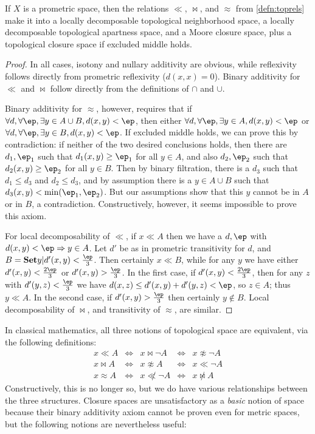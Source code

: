 \documentclass{article}
\def\napprox{\not\approx}
\def\cpl#1{\neg #1}
\let\implies\Rightarrow
\def\fep#1#2{\frac{\if1#1\else#1\fi\ep}{#2}}
\begin{document}
\begin{thm}\label{thm:pmet-top}
  If $X$ is a prometric space, then the relations $\ll$, $\bowtie$, and $\approx$ from \cref{defn:toprels} make it into a locally decomposable topological neighborhood space, a locally decomposable topological apartness space, and a Moore closure space, plus a topological closure space if excluded middle holds.
\end{thm}
\begin{proof}
  In all cases, isotony and nullary additivity are obvious, while reflexivity follows directly from prometric reflexivity ($d(x,x)=0$).
  Binary additivity for $\ll$ and $\bowtie$ follow directly from the definitions of $\cap$ and $\cup$.

  Binary additivity for $\approx$, however, requires that if $\forall d,\forall \ep, \exists y\in A\cup B, d(x,y)<\ep$, then either $\forall d,\forall \ep, \exists y\in A, d(x,y)<\ep$ or $\forall d,\forall \ep, \exists y\in B, d(x,y)<\ep$.
  If excluded middle holds, we can prove this by contradiction: if neither of the two desired conclusions holds, then there are $d_1,\ep_1$ such that $d_1(x,y)\ge \ep_1$ for all $y\in A$, and also $d_2,\ep_2$ such that $d_2(x,y)\ge\ep_2$ for all $y\in B$.
  Then by binary filtration, there is a $d_3$ such that $d_1\le d_3$ and $d_2\le d_3$, and by assumption there is a $y\in A\cup B$ such that $d_3(x,y)<\min(\ep_1,\ep_2)$.
  But our assumptions show that this $y$ cannot be in $A$ or in $B$, a contradiction.
  Constructively, however, it seems impossible to prove this axiom.

  For local decomposability of $\ll$, if $x\ll A$ then we have a $d,\ep$ with $d(x,y)<\ep \implies y\in A$.
  Let $d'$ be as in prometric transitivity for $d$, and $B = \setof{ y | d'(x,y) < \fep13}$.
  Then certainly $x\ll B$, while for any $y$ we have either $d'(x,y)<\fep23$ or $d'(x,y)>\fep13$.
  In the first case, if $d'(x,y)<\fep23$, then for any $z$ with $d'(y,z)<\fep13$ we have $d(x,z) \le d'(x,y)+d'(y,z) <\ep$, so $z\in A$; thus $y\ll A$.
  In the second case, if $d'(x,y)>\fep13$ then certainly $y\notin B$.
  Local decomposability of $\bowtie$, and transitivity of $\approx$, are similar.
\end{proof}

In classical mathematics, all three notions of topological space are equivalent, via the following definitions:
\[
\begin{array}{ccccc}
  x\ll A & \iff & x \bowtie \cpl{A} & \iff & x\napprox \cpl{A}\\
  x\bowtie A & \iff & x\napprox A & \iff & x \ll \cpl{A}\\
  x\approx A & \iff & x \not\ll \cpl{A} & \iff & x \not\bowtie A
\end{array}
\]
Constructively, this is no longer so, but we do have various relationships between the three structures.
Closure spaces are unsatisfactory as a \emph{basic} notion of space because their binary additivity axiom cannot be proven even for metric spaces, but the following notions are nevertheless useful:
\end{document}
